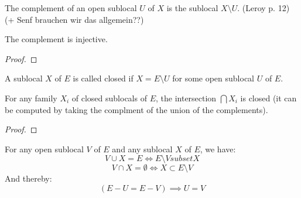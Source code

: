 \begin{definition}[Complement]
    \label{def:complement}
    \leanok
    The complement of an open sublocal $U$ of $X$ is the sublocal $X \setminus U$.
    (Leroy p. 12) (+ Senf brauchen wir das allgemein??)
\end{definition}

\begin{lemma}
    \label{lem:complement_injective}
    \leanok
    The complement is injective.
\end{lemma}
\begin{proof}
    \leanok
\end{proof}

\begin{definition}
    \label{def:closed_sublocal}
    \leanok
    A sublocal $X$ of $E$ is called closed if $X = E \setminus U$ for some open sublocal $U$ of $E$.
\end{definition}

\begin{lemma}
    \label{lem:closed_intersection}
    \leanok
    For any family $X_i$ of closed sublocals of $E$, the intersection $\bigcap X_i$ is closed (it can be computed by
    taking the complment of the union of the complements).
\end{lemma}
\begin{proof}
    \leanok
\end{proof}


\begin{lemma}
    \label{lem:properties_of_complements}
    For any open sublocal $V$ of $E$ and any sublocal $X$ of $E$, we have:
    \[V \cup X = E \iff E \setminus V subset X\]
    \[V \cap X = \emptyset \iff X \subset E \setminus V\]
    And thereby:
    \[(E - U = E - V) \implies U = V\]
\end{lemma}

\begin{comment}
\begin{lemma}[(1.9) Preimage of complements]
    \label{lem:preimage_of_complements}
    \uses{def:complement,lem:properties_of_complements}
    For any morphism of spaces $g: A \to E$ and any open sublocal $V$ of $F$, we have:
    \[g^{-1}(E - V) = A - g^{-1}(V)\]
\end{lemma}
\end{comment}

